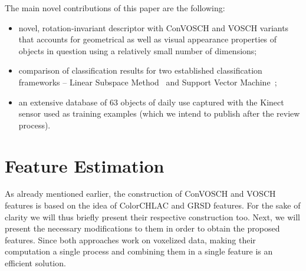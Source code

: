 \documentclass[conference]{sty/IEEEtran}
\begin{document}
The main novel contributions of this paper are the following:
\begin{itemize}
\item novel, rotation-invariant descriptor with ConVOSCH and VOSCH variants that accounts for
geometrical as well as visual appearance  properties of objects in question
using a relatively small number of dimensions;
\item comparison of classification results for two established classification
frameworks -- Linear Subspace Method~\cite{watanabe1973} and Support Vector Machine~\cite{svm99};
\item an extensive database of 63 objects of daily use captured with the Kinect sensor
used as training examples (which we intend to publish after the review process).
\end{itemize}

\section{Feature Estimation}
\label{sec:features}
As already mentioned earlier, the construction of ConVOSCH and VOSCH features is based on the idea of 
ColorCHLAC and GRSD features. For the sake of clarity we will thus briefly present
their respective construction too.
Next, we will present the necessary modifications to them in order to obtain the proposed features.
Since both approaches work on voxelized data, making their computation a single process
and combining them in a single feature is an efficient solution.
\end{document}
